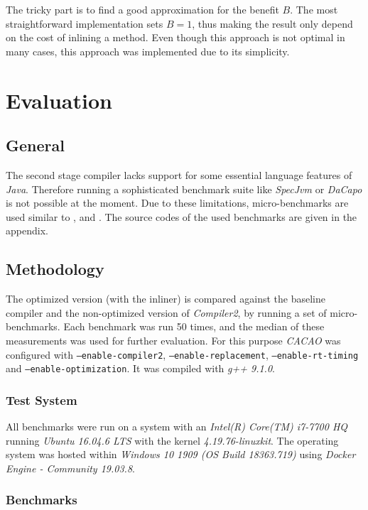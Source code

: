 \documentclass[draft, final]{vutinfth} %
\begin{document}
The tricky part is to find a good approximation for the benefit $B$. The most straightforward implementation sets $B = 1$, thus making the result only depend on the cost of inlining a method. Even though this approach is not optimal in many cases, this approach was implemented due to its simplicity.

\chapter{Evaluation}

\section{General}

The second stage compiler lacks support for some essential language features of \emph{Java}. Therefore running a sophisticated benchmark suite like \emph{SpecJvm} or \emph{DaCapo} is not possible at the moment. Due to these limitations, micro-benchmarks are used similar to \cite{Eisl13}, \cite{Reisinger14} and \cite{Schutzenhofer17}. The source codes of the used benchmarks are given in the appendix.

\section{Methodology}

The optimized version (with the inliner) is compared against the baseline compiler and the non-optimized version of \emph{Compiler2}, by running a set of micro-benchmarks. Each benchmark was run 50 times, and the median of these measurements was used for further evaluation. For this purpose \emph{CACAO} was configured with \texttt{--enable-compiler2}, \texttt{--enable-replacement}, \texttt{--enable-rt-timing} and \texttt{--enable-optimization}. It was compiled with \emph{g++ 9.1.0}.

\subsection{Test System}

All benchmarks were run on a system with an \emph{Intel(R) Core(TM) i7-7700 HQ} running \emph{Ubuntu 16.04.6 LTS} with the kernel \emph{4.19.76-linuxkit}. The operating system was hosted within \emph{Windows 10 1909 (OS Build 18363.719)} using \emph{Docker Engine - Community 19.03.8}.

\subsection{Benchmarks}
\end{document}

